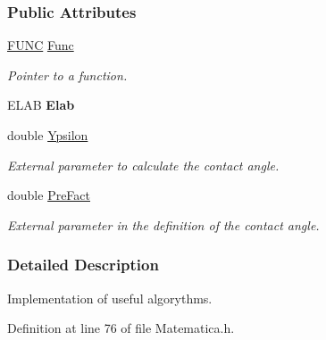 \subsubsection*{\-Public \-Attributes}
\begin{DoxyCompactItemize}
\item 
\hypertarget{classMatematica_aba8f98cb34b78863b26b00d33aabdc1d}{\hyperlink{classMatematica_af3e0600f7cea754ca1ebefb85de3526b}{\-F\-U\-N\-C} \hyperlink{classMatematica_aba8f98cb34b78863b26b00d33aabdc1d}{\-Func}}\label{classMatematica_aba8f98cb34b78863b26b00d33aabdc1d}

\begin{DoxyCompactList}\small\item\em \-Pointer to a function. \end{DoxyCompactList}\item 
\hypertarget{classMatematica_ab450221750ec28195ca862278004e64f}{\-E\-L\-A\-B {\bfseries \-Elab}}\label{classMatematica_ab450221750ec28195ca862278004e64f}

\item 
\hypertarget{classMatematica_aa06af2f751c2d30f883911088239686e}{double \hyperlink{classMatematica_aa06af2f751c2d30f883911088239686e}{\-Ypsilon}}\label{classMatematica_aa06af2f751c2d30f883911088239686e}

\begin{DoxyCompactList}\small\item\em \-External parameter to calculate the contact angle. \end{DoxyCompactList}\item 
\hypertarget{classMatematica_a4eff9d128336501e44aac2b9524eb6b0}{double \hyperlink{classMatematica_a4eff9d128336501e44aac2b9524eb6b0}{\-Pre\-Fact}}\label{classMatematica_a4eff9d128336501e44aac2b9524eb6b0}

\begin{DoxyCompactList}\small\item\em \-External parameter in the definition of the contact angle. \end{DoxyCompactList}\end{DoxyCompactItemize}


\subsubsection{\-Detailed \-Description}
\-Implementation of useful algorythms. 

\-Definition at line 76 of file \-Matematica.\-h.



